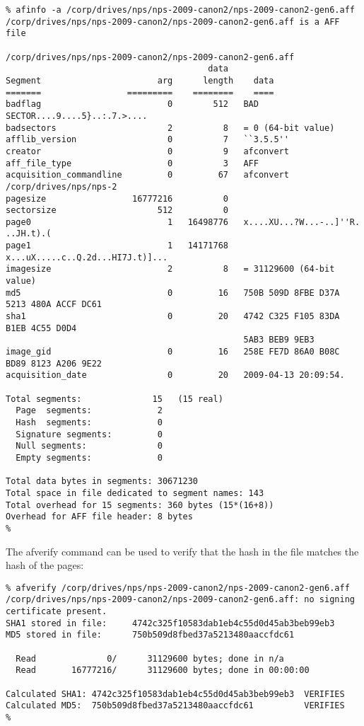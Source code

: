 \begin{Verbatim}
% afinfo -a /corp/drives/nps/nps-2009-canon2/nps-2009-canon2-gen6.aff
/corp/drives/nps/nps-2009-canon2/nps-2009-canon2-gen6.aff is a AFF file

/corp/drives/nps/nps-2009-canon2/nps-2009-canon2-gen6.aff
                                        data       
Segment                       arg      length    data
=======                 =========    ========    ====
badflag                         0        512   BAD SECTOR....9....5}..:.7.>....
badsectors                      2          8   = 0 (64-bit value)
afflib_version                  0          7   ``3.5.5''
creator                         0          9   afconvert
aff_file_type                   0          3   AFF
acquisition_commandline         0         67   afconvert /corp/drives/nps/nps-2
pagesize                 16777216          0   
sectorsize                    512          0   
page0                           1   16498776   x....XU...?W...-..]''R. ..JH.t).(
page1                           1   14171768   x...uX.....c..Q.2d...HI7J.t)]...
imagesize                       2          8   = 31129600 (64-bit value)
md5                             0         16   750B 509D 8FBE D37A 5213 480A ACCF DC61 
sha1                            0         20   4742 C325 F105 83DA B1EB 4C55 D0D4 
                                               5AB3 BEB9 9EB3 
image_gid                       0         16   258E FE7D 86A0 B08C BD89 8123 A206 9E22 
acquisition_date                0         20   2009-04-13 20:09:54.

Total segments:              15   (15 real)
  Page  segments:             2
  Hash  segments:             0
  Signature segments:         0
  Null segments:              0
  Empty segments:             0

Total data bytes in segments: 30671230
Total space in file dedicated to segment names: 143
Total overhead for 15 segments: 360 bytes (15*(16+8))
Overhead for AFF file header: 8 bytes
%  
\end{Verbatim}

The afverify command can be used to verify that the hash in the file
matches the hash of the pages:

\begin{Verbatim}
% afverify /corp/drives/nps/nps-2009-canon2/nps-2009-canon2-gen6.aff
/corp/drives/nps/nps-2009-canon2/nps-2009-canon2-gen6.aff: no signing certificate present. 
SHA1 stored in file:     4742c325f10583dab1eb4c55d0d45ab3beb99eb3
MD5 stored in file:      750b509d8fbed37a5213480aaccfdc61

  Read              0/      31129600 bytes; done in n/a
  Read       16777216/      31129600 bytes; done in 00:00:00

Calculated SHA1: 4742c325f10583dab1eb4c55d0d45ab3beb99eb3  VERIFIES
Calculated MD5:  750b509d8fbed37a5213480aaccfdc61          VERIFIES
% 
\end{Verbatim}



